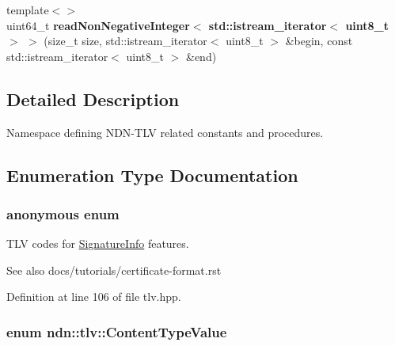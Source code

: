 \begin{DoxyCompactItemize}
\item 
{\footnotesize template$<$$>$ }\\uint64\+\_\+t {\bfseries read\+Non\+Negative\+Integer$<$ std\+::istream\+\_\+iterator$<$ uint8\+\_\+t $>$ $>$} (size\+\_\+t size, std\+::istream\+\_\+iterator$<$ uint8\+\_\+t $>$ \&begin, const std\+::istream\+\_\+iterator$<$ uint8\+\_\+t $>$ \&end)\hypertarget{namespacendn_1_1tlv_a9feaf130f34503050ce2e8ac2925aefd}{}\label{namespacendn_1_1tlv_a9feaf130f34503050ce2e8ac2925aefd}

\end{DoxyCompactItemize}


\subsection{Detailed Description}
Namespace defining N\+D\+N-\/\+T\+LV related constants and procedures. 

\subsection{Enumeration Type Documentation}
\subsubsection[{\texorpdfstring{anonymous enum}{anonymous enum}}]{\setlength{\rightskip}{0pt plus 5cm}anonymous enum}\hypertarget{namespacendn_1_1tlv_ab2e929c8e047b57b192e7c4d3ffc2890}{}\label{namespacendn_1_1tlv_ab2e929c8e047b57b192e7c4d3ffc2890}


T\+LV codes for \hyperlink{classndn_1_1SignatureInfo}{Signature\+Info} features. 

\begin{DoxySeeAlso}{See also}
docs/tutorials/certificate-\/format.\+rst 
\end{DoxySeeAlso}


Definition at line 106 of file tlv.\+hpp.

\subsubsection[{\texorpdfstring{Content\+Type\+Value}{ContentTypeValue}}]{\setlength{\rightskip}{0pt plus 5cm}enum {\bf ndn\+::tlv\+::\+Content\+Type\+Value}}\hypertarget{namespacendn_1_1tlv_aaa845994b4f59fdab8bf0bbbe51e204b}{}\label{namespacendn_1_1tlv_aaa845994b4f59fdab8bf0bbbe51e204b}


